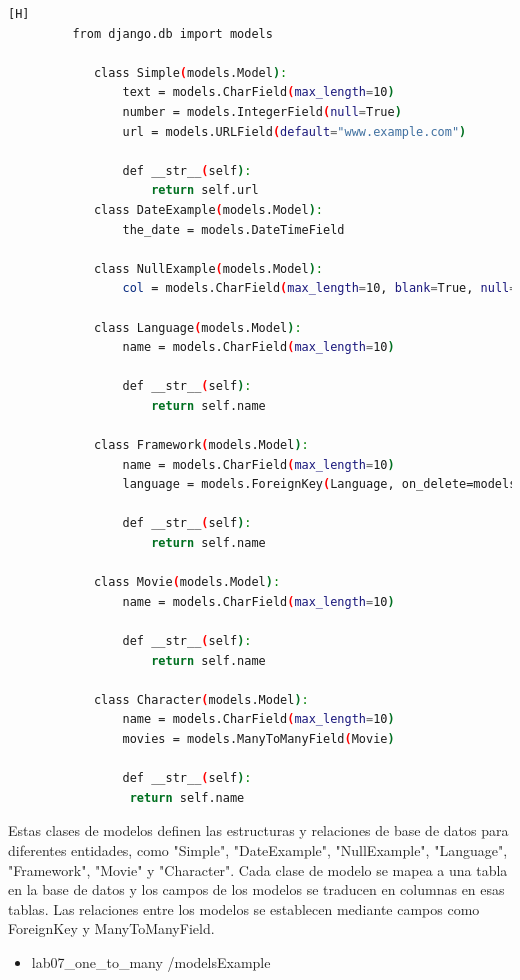 \documentclass{article}
\begin{document}
        \begin{lstlisting}[language=bash,caption={models.py del proyecto}][H]
         from django.db import models
    
            class Simple(models.Model):
                text = models.CharField(max_length=10)
                number = models.IntegerField(null=True)
                url = models.URLField(default="www.example.com")
            
                def __str__(self):
                    return self.url
            class DateExample(models.Model):
                the_date = models.DateTimeField
            
            class NullExample(models.Model):
                col = models.CharField(max_length=10, blank=True, null=True)
            
            class Language(models.Model):
                name = models.CharField(max_length=10)
            
                def __str__(self):
                    return self.name
            
            class Framework(models.Model):
                name = models.CharField(max_length=10)
                language = models.ForeignKey(Language, on_delete=models.CASCADE)
            
                def __str__(self):
                    return self.name
                
            class Movie(models.Model):
                name = models.CharField(max_length=10)
            
                def __str__(self):
                    return self.name
            
            class Character(models.Model):
                name = models.CharField(max_length=10)
                movies = models.ManyToManyField(Movie)
            
                def __str__(self):
                 return self.name
	\end{lstlisting}
        Estas clases de modelos definen las estructuras y relaciones de base de datos para diferentes entidades, como "Simple", "DateExample", "NullExample", "Language", "Framework", "Movie" y "Character". Cada clase de modelo se mapea a una tabla en la base de datos y los campos de los modelos se traducen en columnas en esas tablas. Las relaciones entre los modelos se establecen mediante campos como ForeignKey y ManyToManyField.
        \begin{itemize}
            \item lab07\_one\_to\_many /modelsExample
        \end{itemize}
\end{document}
